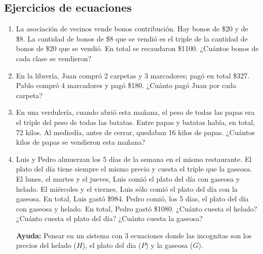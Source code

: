\documentclass{article}
\begin{document}
\newpage
\subsection{Ejercicios de ecuaciones}
\begin{enumerate}
	\item La asociación de vecinos vende bonos contribución. Hay bonos de \$20 y de \$8. La cantidad de bonos de \$8 que se vendió es el triple de la cantidad de bonos de \$20 que se vendió. En total se recaudaron \$1100. ¿Cuántos bonos de cada clase se vendieron? 
	\item En la librería, Juan compró 2 carpetas y 3 marcadores; pagó en total \$327. Pablo compró 4 marcadores y pagó \$180. ¿Cuánto pagó Juan por cada carpeta?
	\item En una verdulería, cuando abrió esta mañana, el peso de todas las papas era el triple del peso de todas las batatas. Entre papas y batatas había, en total, 72 kilos. Al mediodía, antes de cerrar, quedaban 16 kilos de papas. ¿Cuántos kilos de papas se vendieron esta mañana?
	\item Luis y Pedro almuerzan los 5 días de la semana en el mismo restaurante. El plato del día tiene siempre el mismo precio y cuesta el triple que la gaseosa. El lunes, el martes y el jueves, Luis comió el plato del día con gaseosa y helado. El miércoles y el viernes, Luis sólo comió el plato del día con la gaseosa. En total, Luis gastó \$984. Pedro comió, los 5 días, el plato del día con gaseosa y helado. En total, Pedro gastó \$1080. ¿Cuánto cuesta el helado? ¿Cuánto cuesta el plato del día? ¿Cuánto cuesta la gaseosa?\\ \begin{small}\textbf{Ayuda:} Pensar en un sistema con 3 ecuaciones donde las incognitas son los precios del helado ($H$), el plato del dia ($P$) y la gaseosa ($G$).\end{small}
\end{enumerate}

\newpage
\end{document}
